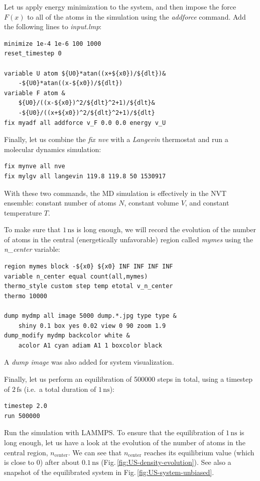 \documentclass[9pt,tutorial]{livecoms}
\begin{document}
Let us apply energy minimization to the system, and then impose the force $F(x)$
to all of the atoms in the simulation using the \textit{addforce} command. Add
the following lines to \textit{input.lmp}:
{\normalsize \begin{verbatim}
minimize 1e-4 1e-6 100 1000
reset_timestep 0

variable U atom ${U0}*atan((x+${x0})/${dlt})&
    -${U0}*atan((x-${x0})/${dlt})
variable F atom &
    ${U0}/((x-${x0})^2/${dlt}^2+1)/${dlt}&
    -${U0}/((x+${x0})^2/${dlt}^2+1)/${dlt}
fix myadf all addforce v_F 0.0 0.0 energy v_U
\end{verbatim}}
Finally, let us combine the \textit{fix nve} with a \textit{Langevin} thermostat
and run a molecular dynamics simulation:
{\normalsize \begin{verbatim}
fix mynve all nve
fix mylgv all langevin 119.8 119.8 50 1530917
\end{verbatim}}
With these two commands, the MD simulation
is effectively in the NVT ensemble: constant number of atoms $N$, constant volume
$V$, and constant temperature $T$.

To make sure that $1\,\text{ns}$ is long enough, we will record the evolution of
the number of atoms in the central (energetically unfavorable) region called \textit{mymes}
using the \textit{n\_center} variable:
{\normalsize \begin{verbatim}
region mymes block -${x0} ${x0} INF INF INF INF
variable n_center equal count(all,mymes)
thermo_style custom step temp etotal v_n_center
thermo 10000

dump mydmp all image 5000 dump.*.jpg type type &
    shiny 0.1 box yes 0.02 view 0 90 zoom 1.9
dump_modify mydmp backcolor white &
    acolor A1 cyan adiam A1 1 boxcolor black
\end{verbatim}}
A \textit{dump image} was also added for system visualization.

Finally, let us perform an equilibration of 500000 steps
in total, using a timestep of $2\,\text{fs}$ (i.e.~a total duration of $1\,\text{ns}$):
{\normalsize \begin{verbatim}
timestep 2.0
run 500000
\end{verbatim}}
Run the simulation with LAMMPS. To ensure that the equilibration of $1\,\text{ns}$ is long
enough, let us have a look at the evolution of the number of atoms in the central region,
$n_\mathrm{center}$. We can see that $n_\mathrm{center}$ reaches
its equilibrium value (which is close to 0) after about $0.1\,\text{ns}$
(Fig.\,\ref{fig:US-density-evolution}). See also a snapshot of the equilibrated
system in Fig.\,\ref{fig:US-system-unbiased}.
\end{document}
